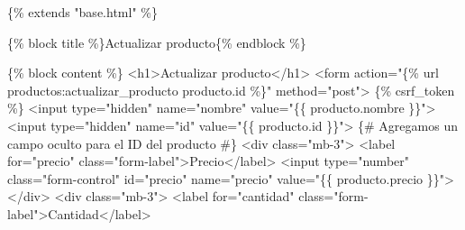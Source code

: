 \documentclass[
  a4paper,
  DIV=11,
  numbers=noendperiod,
  onepage,
  openany]{scrreprt}
\newenvironment{Shaded}{\begin{snugshade}}{\end{snugshade}}
\newcommand{\DataTypeTok}[1]{\textcolor[rgb]{0.68,0.00,0.00}{#1}}
\newcommand{\KeywordTok}[1]{\textcolor[rgb]{0.00,0.23,0.31}{#1}}
\newcommand{\NormalTok}[1]{\textcolor[rgb]{0.00,0.23,0.31}{#1}}
\newcommand{\OperatorTok}[1]{\textcolor[rgb]{0.37,0.37,0.37}{#1}}
\newcommand{\OtherTok}[1]{\textcolor[rgb]{0.00,0.23,0.31}{#1}}
\newcommand{\StringTok}[1]{\textcolor[rgb]{0.13,0.47,0.30}{#1}}
\begin{document}
\begin{Shaded}
\begin{Highlighting}[]
\NormalTok{\{\% extends "base.html" \%\}}

\NormalTok{\{\% block title \%\}Actualizar producto\{\% endblock \%\}}

\NormalTok{\{\% block content \%\}}
\DataTypeTok{\textless{}}\KeywordTok{h1}\DataTypeTok{\textgreater{}}\NormalTok{Actualizar producto}\DataTypeTok{\textless{}/}\KeywordTok{h1}\DataTypeTok{\textgreater{}}
\DataTypeTok{\textless{}}\KeywordTok{form}\OtherTok{ action}\OperatorTok{=}\StringTok{"\{\% url \textquotesingle{}productos:actualizar\_producto\textquotesingle{} producto.id \%\}"}\OtherTok{ method}\OperatorTok{=}\StringTok{"post"}\DataTypeTok{\textgreater{}}
\NormalTok{    \{\% csrf\_token \%\}}
    \DataTypeTok{\textless{}}\KeywordTok{input}\OtherTok{ type}\OperatorTok{=}\StringTok{"hidden"}\OtherTok{ name}\OperatorTok{=}\StringTok{"nombre"}\OtherTok{ value}\OperatorTok{=}\StringTok{"\{\{ producto.nombre \}\}"}\DataTypeTok{\textgreater{}}
    \DataTypeTok{\textless{}}\KeywordTok{input}\OtherTok{ type}\OperatorTok{=}\StringTok{"hidden"}\OtherTok{ name}\OperatorTok{=}\StringTok{"id"}\OtherTok{ value}\OperatorTok{=}\StringTok{"\{\{ producto.id \}\}"}\DataTypeTok{\textgreater{}}\NormalTok{ \{\# Agregamos un campo oculto para el ID del producto \#\}}
    \DataTypeTok{\textless{}}\KeywordTok{div}\OtherTok{ class}\OperatorTok{=}\StringTok{"mb{-}3"}\DataTypeTok{\textgreater{}}
        \DataTypeTok{\textless{}}\KeywordTok{label}\OtherTok{ for}\OperatorTok{=}\StringTok{"precio"}\OtherTok{ class}\OperatorTok{=}\StringTok{"form{-}label"}\DataTypeTok{\textgreater{}}\NormalTok{Precio}\DataTypeTok{\textless{}/}\KeywordTok{label}\DataTypeTok{\textgreater{}}
        \DataTypeTok{\textless{}}\KeywordTok{input}\OtherTok{ type}\OperatorTok{=}\StringTok{"number"}\OtherTok{ class}\OperatorTok{=}\StringTok{"form{-}control"}\OtherTok{ id}\OperatorTok{=}\StringTok{"precio"}\OtherTok{ name}\OperatorTok{=}\StringTok{"precio"}\OtherTok{ value}\OperatorTok{=}\StringTok{"\{\{ producto.precio \}\}"}\DataTypeTok{\textgreater{}}
    \DataTypeTok{\textless{}/}\KeywordTok{div}\DataTypeTok{\textgreater{}}
    \DataTypeTok{\textless{}}\KeywordTok{div}\OtherTok{ class}\OperatorTok{=}\StringTok{"mb{-}3"}\DataTypeTok{\textgreater{}}
        \DataTypeTok{\textless{}}\KeywordTok{label}\OtherTok{ for}\OperatorTok{=}\StringTok{"cantidad"}\OtherTok{ class}\OperatorTok{=}\StringTok{"form{-}label"}\DataTypeTok{\textgreater{}}\NormalTok{Cantidad}\DataTypeTok{\textless{}/}\KeywordTok{label}\DataTypeTok{\textgreater{}}

\end{Highlighting}
\end{Shaded}
\end{document}
